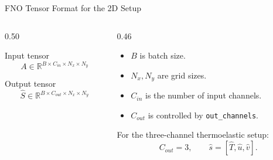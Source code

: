 \documentclass[aspectratio=169,10pt]{beamer}
\begin{document}
\begin{frame}{FNO Tensor Format for the 2D Setup}
  \begin{columns}[T]
    \begin{column}{0.50\textwidth}
      \begin{block}{Input tensor}
        \[
          A\in\mathbb{R}^{B\times C_{in}\times N_x\times N_y}
        \]
      \end{block}
      \begin{block}{Output tensor}
        \[
          \hat{S}\in\mathbb{R}^{B\times C_{out}\times N_x\times N_y}
        \]
      \end{block}
    \end{column}
    \begin{column}{0.46\textwidth}
      \footnotesize
      \begin{itemize}
        \item $B$ is batch size.
        \item $N_x,N_y$ are grid sizes.
        \item $C_{in}$ is the number of input channels.
        \item $C_{out}$ is controlled by \texttt{out\_channels}.
      \end{itemize}
      \vskip 4pt
      For the three-channel thermoelastic setup:
      \[
        C_{out}=3,\qquad \hat{s}=[\hat{T},\hat{u},\hat{v}].
      \]
    \end{column}
  \end{columns}
\end{frame}
\end{document}
